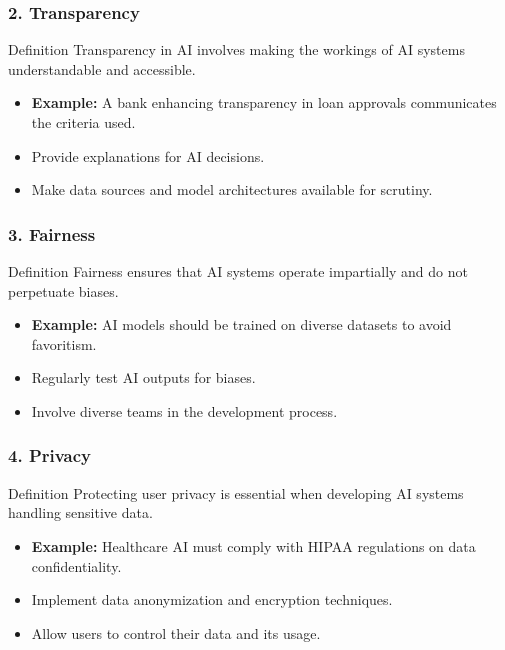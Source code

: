 \documentclass[aspectratio=169]{beamer}
\begin{document}
\begin{frame}[fragile]
    \frametitle{2. Transparency}
    \begin{block}{Definition}
        Transparency in AI involves making the workings of AI systems understandable and accessible.
    \end{block}
    \begin{itemize}
        \item \textbf{Example:} A bank enhancing transparency in loan approvals communicates the criteria used.
    \end{itemize}
    \begin{itemize}
        \item Provide explanations for AI decisions.
        \item Make data sources and model architectures available for scrutiny.
    \end{itemize}
\end{frame}

\begin{frame}[fragile]
    \frametitle{3. Fairness}
    \begin{block}{Definition}
        Fairness ensures that AI systems operate impartially and do not perpetuate biases.
    \end{block}
    \begin{itemize}
        \item \textbf{Example:} AI models should be trained on diverse datasets to avoid favoritism.
    \end{itemize}
    \begin{itemize}
        \item Regularly test AI outputs for biases.
        \item Involve diverse teams in the development process.
    \end{itemize}
\end{frame}

\begin{frame}[fragile]
    \frametitle{4. Privacy}
    \begin{block}{Definition}
        Protecting user privacy is essential when developing AI systems handling sensitive data.
    \end{block}
    \begin{itemize}
        \item \textbf{Example:} Healthcare AI must comply with HIPAA regulations on data confidentiality.
    \end{itemize}
    \begin{itemize}
        \item Implement data anonymization and encryption techniques.
        \item Allow users to control their data and its usage.
    \end{itemize}
\end{frame}
\end{document}
